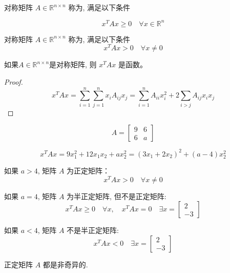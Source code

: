 \begin{definition}[半正定矩阵]
    对称矩阵 $ A \in \mathbb{R}^{n \times n} $ 称为, 满足以下条件

$$
x^{T} A x \geq 0 \quad \forall x \in \mathbb{R}^{n}
$$
\end{definition}

\begin{definition}[正定矩阵]
    对称矩阵 $ A \in \mathbb{R}^{n \times n} $ 称为, 满足以下条件
$$
x^{T} A x>0 \quad \forall x \neq 0
$$
\end{definition}

\begin{definition}[二次型]
    如果$ A \in \mathbb{R}^{n \times n} $是对称矩阵, 则 $ x^{T} A x $ 是函数。
\end{definition}

\begin{proof}
    $$ x^{T} A x=\sum_{i=1}^{n} \sum_{j=1}^{n} x_{i} A_{i j} x_{j}=\sum_{i=1}^{n} A_{i i} x_{i}^{2}+2 \sum_{i>j} A_{i j} x_{i} x_{j} $$
\end{proof}

\begin{example}
    $$ A=\left[\begin{array}{ll}9 & 6 \\ 6 & a\end{array}\right] $$

    $$ x^{T} A x=9 x_{1}^{2}+12 x_{1} x_{2}+a x_{2}^{2}=\left(3 x_{1}+2 x_{2}\right)^{2}+(a-4) x_{2}^{2} $$

    如果 $ a>4 $, 矩阵 $ A $ 为正定矩阵：
$$
x^{T} A x>0 \quad \forall x \neq 0
$$

如果 $ a=4 $, 矩阵 $ A $ 为半正定矩阵, 但不是正定矩阵:
$$
x^{T} A x \geq 0 \quad \forall x, \quad x^{T} A x=0 \quad \exists x=\left[\begin{array}{l}
2 \\
-3
\end{array}\right]
$$

如果 $ a<4 $, 矩阵 $ A $ 不是半正定矩阵:
$$
x^{T} A x<0 \quad \exists x=\left[\begin{array}{l}
2 \\
-3
\end{array}\right]
$$
\end{example}

\begin{theorem}
    正定矩阵 $ A $ 都是非奇异的.
\end{theorem}

